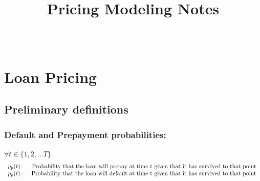 \documentclass[12pt]{book}
\newenvironment{theorem}[2][Theorem]{\begin{trivlist}
\item[\hskip \labelsep {\bfseries #1}\hskip \labelsep {\bfseries #2.}]}{\end{trivlist}}
\begin{document}
 
 
\title{Pricing Modeling Notes}%
\author{\\ %
} %
 
\maketitle
 
 

\chapter{Loan Pricing}
\section{ Preliminary definitions} 
\subsection{Default and Prepayment probabilities:}
$ \forall t \in \{1,2,...T\}$
\[ %
\begin{array}{rr} %
   p_p(t)  :&  \mbox{
   Probability that the loan will prepay at time t given that it has survived to that point } \\
   p_p(t)  : &  \mbox{
   Probability that the loan will default at time t given that it has survived to that point
   }
\end{array} \noindent%
\] %
\end{document}
